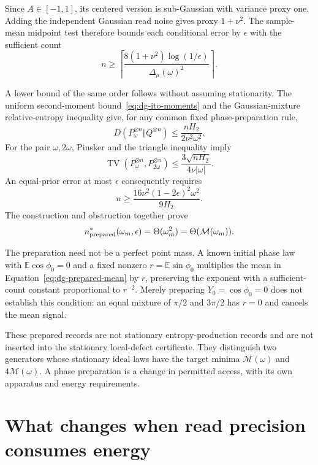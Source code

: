 Since $A\in[-1,1]$, its centered version is sub-Gaussian with variance proxy
one. Adding the independent Gaussian read noise gives proxy $1+\nu^2$.
The sample-mean midpoint test therefore bounds each conditional error by
$\epsilon$ with the sufficient count
\begin{equation}
 n\geq
 \left\lceil
 \frac{8(1+\nu^2)\log(1/\epsilon)}{\Delta_\mu(\omega)^2}
 \right\rceil.
 \label{eq:dg-prepared-sufficient}
\end{equation}

A lower bound of the same order follows without assuming stationarity.
The uniform second-moment bound~\eqref{eq:dg-ito-moments} and the
Gaussian-mixture relative-entropy inequality give, for any common fixed
phase-preparation rule,
\[
 D(P_\omega^{\otimes n}\Vert Q^{\otimes n})
 \leq\frac{nH_2}{2\nu^2\omega^2}.
\]
For the pair $\omega,2\omega$, Pinsker and the triangle inequality imply
\[
 \operatorname{TV}(P_\omega^{\otimes n},P_{2\omega}^{\otimes n})
 \leq\frac{3\sqrt{nH_2}}{4\nu|\omega|}.
\]
An equal-prior error at most $\epsilon$ consequently requires
\begin{equation}
 n\geq\frac{16\nu^2(1-2\epsilon)^2\omega^2}{9H_2}.
 \label{eq:dg-prepared-necessary}
\end{equation}
The construction and obstruction together prove
\begin{equation}
 n^*_{\rm prepared}(\omega_m,\epsilon)=\Theta(\omega_m^2)
         =\Theta(\mathcal M(\omega_m)).
 \label{eq:dg-prepared-rate}
\end{equation}

The preparation need not be a perfect point mass. A known initial phase
law with $\mathbb E\cos\phi_0=0$ and a fixed nonzero
$r=\mathbb E\sin\phi_0$ multiplies the mean in
Equation~\eqref{eq:dg-prepared-mean} by $r$, preserving the exponent with
a sufficient-count constant proportional to $r^{-2}$. Merely preparing
$Y_0=\cos\phi_0=0$ does not establish this condition: an equal mixture of
$\pi/2$ and $3\pi/2$ has $r=0$ and cancels the mean signal.

These prepared records are not stationary entropy-production records and are
not inserted into the stationary local-defect certificate. They distinguish
two generators whose stationary ideal laws have the target minima
$\mathcal M(\omega)$ and $4\mathcal M(\omega)$. A phase preparation is a
change in permitted access, with its own apparatus and energy requirements.

\section{What changes when read precision consumes energy}

